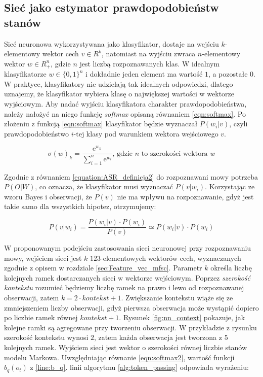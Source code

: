 \documentclass[shortabstract, mgr]{iithesis}
\begin{document}
	\subsection{Sieć jako estymator prawdopodobieństw stanów }
	\label{sec:nn_estymator}
		Sieć neuronowa wykorzystywana jako klasyfikator, dostaje na wejściu $k$-elementowy wektor cech $v \in R^k$, natomiast na wyjściu zwraca $n$-elementowy wektor $w \in R_+^n$, gdzie $n$ jest liczbą rozpoznawanych klas. W idealnym klasyfikatorze $w \in \{0,1\}^n$ i dokładnie jeden element ma wartość $1$, a pozostałe $0$. W praktyce, klasyfikatory nie udzielają tak idealnych odpowiedzi, dlatego uznajemy, że klasyfikator wybiera klasę o największej wartości w wektorze wyjściowym. Aby nadać wyjściu klasyfikatora charakter prawdopodobieństwa, należy nałożyć na niego funkcję \textit{softmax} opisaną równaniem \ref{eqn:softmax}. Po złożeniu z funkcją \ref{eqn:softmax} klasyfikator będzie wyznaczał $P(w_i|v)$, czyli prawdopodobieństwo $i$-tej klasy pod warunkiem wektora wejściowego $v$.
		
		\begin{equation}
			\sigma(w)_k=\frac{\mathrm{e}^{w_k}}{\sum_{i=1}^{n} \mathrm{e}^{w_i}}
			\text{,   gdzie $n$ to szerokości wektora $w$}
			\label{eqn:softmax}
		\end{equation}
		
		Zgodnie z równaniem \ref{equation:ASR_definicja2} do rozpoznawani mowy potrzeba $P(O|W)$, co oznacza, że klasyfikator musi wyznaczać $P(v|w_i)$. Korzystając ze wzoru Bayes i obserwacji, że $P(v)$ nie ma wpływu na rozpoznawanie, gdyż jest takie samo dla wszystkich hipotez, otrzymujemy:
		
		\begin{equation}
			P(v|w_i) = \frac{P(w_i|v) \cdot P(w_i)}{P(v)}\simeq P(w_i|v) \cdot P(w_i)
			\label{eqn:softmax2}
		\end{equation}
		
		 W proponowanym podejściu zastosowania sieci neuronowej przy rozpoznawaniu mowy, wejściem sieci jest $k$ $123$-elementowych wektorów cech, wyznaczanych zgodnie z opisem w rozdziale \ref{sec:Feature_vec_mfsc}. Parametr $k$ określa liczbę kolejnych ramek dostarczanych sieci w wektorze wejściowym. Poprzez \textit{szerokość kontekstu} rozumieć będziemy liczbę ramek na prawo i lewo od rozpoznawanej obserwacji, zatem $k = 2 \cdot kontekst + 1$. Zwiększanie kontekstu wiąże się ze zmniejszeniem liczby obserwacji, gdyż pierwsza obserwacja może wystąpić dopiero po liczbie ramek równej $kontekst + 1$. Rysunek \ref{fig:nn_context} pokazuje, jak kolejne ramki są agregowane przy tworzeniu obserwacji. W przykładzie z rysunku szerokość kontekstu wynosi $2$, zatem każda obserwacja jest tworzona z $5$ kolejnych ramek. Wyjściem sieci jest wektor o szerokości równej liczbie stanów modelu Markowa. Uwzględniając równanie \ref{eqn:softmax2}, wartość funkcji $b_q(o_t)$ z \ref{line:b_q}. linii algorytmu \ref{alg:token_passing} odpowiada wyrażeniu:
		 
\end{document}
